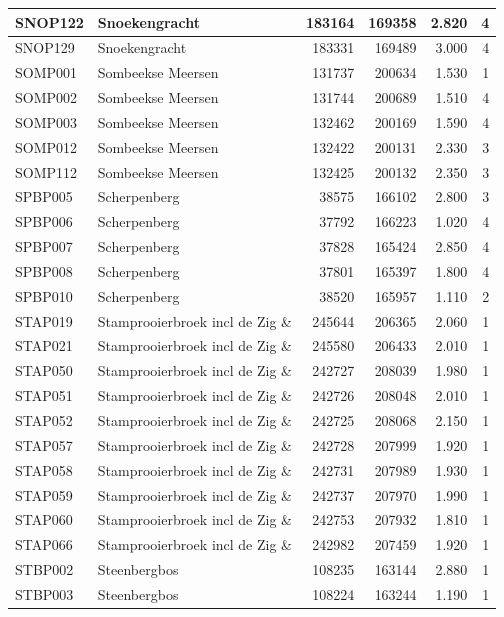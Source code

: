 \documentclass[11pt,]{book}
\begin{document}
\begin{table}
\begin{tabular}[t]{l|l|r|r|r|r}
\hline
SNOP122 & Snoekengracht & 183164 & 169358 & 2.820 & 4\\
\hline
SNOP129 & Snoekengracht & 183331 & 169489 & 3.000 & 4\\
\hline
SOMP001 & Sombeekse Meersen & 131737 & 200634 & 1.530 & 1\\
\hline
SOMP002 & Sombeekse Meersen & 131744 & 200689 & 1.510 & 4\\
\hline
SOMP003 & Sombeekse Meersen & 132462 & 200169 & 1.590 & 4\\
\hline
SOMP012 & Sombeekse Meersen & 132422 & 200131 & 2.330 & 3\\
\hline
SOMP112 & Sombeekse Meersen & 132425 & 200132 & 2.350 & 3\\
\hline
SPBP005 & Scherpenberg & 38575 & 166102 & 2.800 & 3\\
\hline
SPBP006 & Scherpenberg & 37792 & 166223 & 1.020 & 4\\
\hline
SPBP007 & Scherpenberg & 37828 & 165424 & 2.850 & 4\\
\hline
SPBP008 & Scherpenberg & 37801 & 165397 & 1.800 & 4\\
\hline
SPBP010 & Scherpenberg & 38520 & 165957 & 1.110 & 2\\
\hline
STAP019 & Stamprooierbroek incl de Zig \& & 245644 & 206365 & 2.060 & 1\\
\hline
STAP021 & Stamprooierbroek incl de Zig \& & 245580 & 206433 & 2.010 & 1\\
\hline
STAP050 & Stamprooierbroek incl de Zig \& & 242727 & 208039 & 1.980 & 1\\
\hline
STAP051 & Stamprooierbroek incl de Zig \& & 242726 & 208048 & 2.010 & 1\\
\hline
STAP052 & Stamprooierbroek incl de Zig \& & 242725 & 208068 & 2.150 & 1\\
\hline
STAP057 & Stamprooierbroek incl de Zig \& & 242728 & 207999 & 1.920 & 1\\
\hline
STAP058 & Stamprooierbroek incl de Zig \& & 242731 & 207989 & 1.930 & 1\\
\hline
STAP059 & Stamprooierbroek incl de Zig \& & 242737 & 207970 & 1.990 & 1\\
\hline
STAP060 & Stamprooierbroek incl de Zig \& & 242753 & 207932 & 1.810 & 1\\
\hline
STAP066 & Stamprooierbroek incl de Zig \& & 242982 & 207459 & 1.920 & 1\\
\hline
STBP002 & Steenbergbos & 108235 & 163144 & 2.880 & 1\\
\hline
STBP003 & Steenbergbos & 108224 & 163244 & 1.190 & 1\\

\end{tabular}
\end{table}
\end{document}
